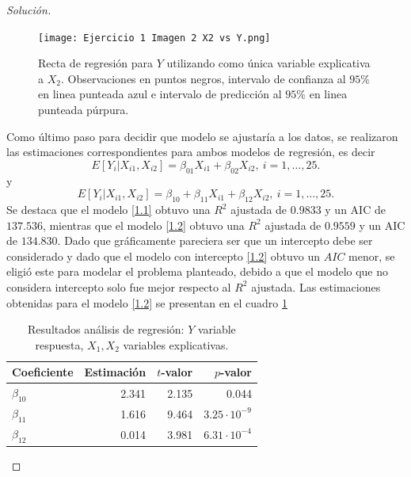 \documentclass[10.5pt,notitlepage]{article}
\newenvironment{solucion}
  {\begin{proof}[Solución]}
  {\end{proof}}
\theoremstyle{plain}
\begin{document}
\begin{solucion}
\begin{figure}[htb]
 \centering
 \texttt{[image: Ejercicio 1 Imagen 2 X2 vs Y.png]}
 \caption{Recta de regresión para \(Y\) utilizando como única variable explicativa a \(X_2\). Observaciones en puntos negros, intervalo de confianza al \(95\%\) en linea punteada azul e intervalo de predicción al \(95\%\) en linea punteada púrpura.}
\label{fig:2}
\end{figure}
Como último paso para decidir que modelo se ajustaría a los datos, se realizaron las estimaciones correspondientes para ambos modelos de regresión, es decir
\begin{equation}\label{1.1}
        E[Y_{i}|X_{i1}, X_{i2}] = \beta_{01}X_{i1} + \beta_{02} X_{i2}, \ i =1, \hdots,25. 
\end{equation}
y 
\begin{equation}\label{1.2}
        E[Y_{i}|X_{i1}, X_{i2}] =\beta_{10} + \beta_{11}X_{i1} + \beta_{12}X_{i2}, \ i =1, \hdots,25.
\end{equation}
Se destaca que el modelo \eqref{1.1} obtuvo una \(R^2\) ajustada de \(0.9833\) y un AIC de \(137.536\), mientras que el modelo \eqref{1.2} obtuvo una \(R^2\) ajustada de \(0.9559\) y un AIC de \(134.830\). Dado que gráficamente pareciera ser que un intercepto debe ser considerado y dado que el modelo con intercepto \eqref{1.2} obtuvo un \(AIC\) menor, se eligió este para modelar el problema planteado, debido a que el modelo que no considera intercepto solo fue mejor respecto al \(R^2\) ajustada. Las estimaciones obtenidas para el modelo \eqref{1.2} se presentan en el cuadro \ref{tab:reg2}
\begin{table}[H]
        \centering
        \begin{tabular}{@{}l@{\hskip 0.3in}r@{\hskip 0.3in}r@{\hskip 0.3in}r@{}}
            \toprule
            Coeficiente& Estimación & \(t\)-valor& \(p\)-valor \\
            \midrule
            \(\beta_{10}\) & 2.341& 2.135&0.044\\
            \(\beta_{11}\) & 1.616&  9.464& \(3.25\cdot10^{-9}\)\\ 
            \(\beta_{12}\) & 0.014&  3.981& \(6.31\cdot10^{-4}\)\\
            \bottomrule
        \end{tabular}
        \caption{Resultados análisis de regresión: \(Y\) variable respuesta, \(X_1, X_2\) variables explicativas.}
        \label{tab:reg2}
\end{table}

\end{solucion}
\end{document}

